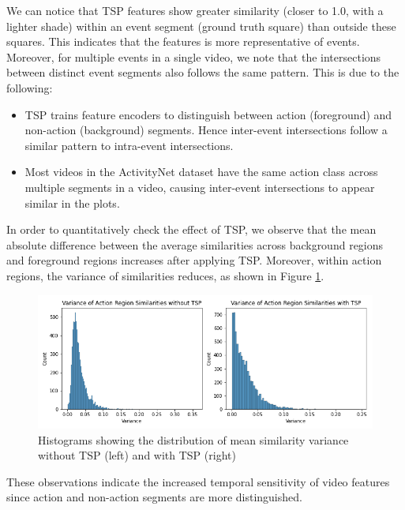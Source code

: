 \par We can notice that TSP features show greater similarity (closer to 1.0, with a lighter shade) within an event segment (ground truth square) than outside these squares. This indicates that the features is more representative of events. Moreover, for multiple events in a single video, we note that the intersections between distinct event segments also follows the same pattern. This is due to the following: 
\begin{itemize}
	\item TSP trains feature encoders to distinguish between action (foreground) and non-action (background) segments. Hence inter-event intersections follow a similar pattern to intra-event intersections.
	\item Most videos in the ActivityNet dataset have the same action class across multiple segments in a video, causing inter-event intersections to appear similar in the plots.
\end{itemize}

\par In order to quantitatively check the effect of TSP, we observe that the mean absolute difference between the average similarities across background regions and foreground regions increases after applying TSP. Moreover, within action regions, the variance of similarities reduces, as shown in Figure \ref{fig:tsp-action-var}.


\begin{figure}
    \includegraphics[width=\linewidth]{assets/img/tsp/tsp-action-sim.png}
    \caption{Histograms showing the distribution of mean similarity variance without TSP (left) and with TSP (right)}

	\label{fig:tsp-action-var}
\end{figure}

\par These observations indicate the increased temporal sensitivity of video features since action and non-action segments are more distinguished.